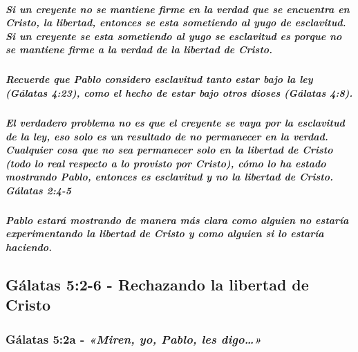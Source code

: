 \documentclass[11a pt,twoside]{article}
\newcommand{\scripture}[1]{%
  {\fontsize{12pt}{16pt}\selectfont\ScriptureFont\itshape #1}%
}
\let\oldsubsection\subsection
\renewcommand{\subsection}{\needspace{5\baselineskip}\oldsubsection}
\let\oldsubsubsection\subsubsection
\renewcommand{\subsubsection}{\needspace{4\baselineskip}\oldsubsubsection}
\let\oldsubparagraph\subparagraph
\renewcommand{\subparagraph}{\needspace{2\baselineskip}\oldsubparagraph}
\begin{document}
\subparagraph{Si un creyente no se mantiene firme en la verdad que se
encuentra en Cristo, la libertad, entonces se esta sometiendo al yugo de
esclavitud. Si un creyente se esta sometiendo al yugo se esclavitud es
porque no se mantiene firme a la verdad de la libertad de
Cristo.}\label{si-un-creyente-no-se-mantiene-firme-en-la-verdad-que-se-encuentra-en-cristo-la-libertad-entonces-se-esta-sometiendo-al-yugo-de-esclavitud.-si-un-creyente-se-esta-sometiendo-al-yugo-se-esclavitud-es-porque-no-se-mantiene-firme-a-la-verdad-de-la-libertad-de-cristo.}

\subparagraph{Recuerde que Pablo considero esclavitud tanto estar bajo
la ley (Gálatas 4:23), como el hecho de estar bajo otros dioses (Gálatas
4:8).}\label{recuerde-que-pablo-considero-esclavitud-tanto-estar-bajo-la-ley-guxe1latas-423-como-el-hecho-de-estar-bajo-otros-dioses-guxe1latas-48.}

\subparagraph{El verdadero problema no es que el creyente se vaya por la
esclavitud de la ley, eso solo es un resultado de no permanecer en la
verdad. Cualquier cosa que no sea permanecer solo en la libertad de
Cristo (todo lo real respecto a lo provisto por Cristo), cómo lo ha
estado mostrando Pablo, entonces es esclavitud y no la libertad de
Cristo. Gálatas
2:4-5}\label{el-verdadero-problema-no-es-que-el-creyente-se-vaya-por-la-esclavitud-de-la-ley-eso-solo-es-un-resultado-de-no-permanecer-en-la-verdad.-cualquier-cosa-que-no-sea-permanecer-solo-en-la-libertad-de-cristo-todo-lo-real-respecto-a-lo-provisto-por-cristo-cuxf3mo-lo-ha-estado-mostrando-pablo-entonces-es-esclavitud-y-no-la-libertad-de-cristo.-guxe1latas-24-5}

\subparagraph{Pablo estará mostrando de manera más clara como alguien no
estaría experimentando la libertad de Cristo y como alguien si lo
estaría
haciendo.}\label{pablo-estaruxe1-mostrando-de-manera-muxe1s-clara-como-alguien-no-estaruxeda-experimentando-la-libertad-de-cristo-y-como-alguien-si-lo-estaruxeda-haciendo.}

\subsection{Gálatas 5:2-6 - Rechazando la libertad de
Cristo}\label{guxe1latas-52-6---rechazando-la-libertad-de-cristo}

\subsubsection{\texorpdfstring{Gálatas 5:2a -
\scripture{«Miren, yo, Pablo, les digo…»}}{Gálatas 5:2a - }}\label{guxe1latas-52a---miren-yo-pablo-les-digo}
\end{document}
